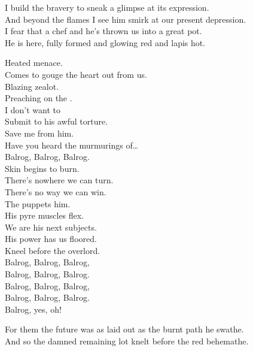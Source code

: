 
I build the bravery to sneak a glimpse at its expression. \\
And beyond the flames I see him smirk at our present depression. \\

I fear that  a chef and he's thrown us into a great pot. \\
He is here, fully formed and glowing red and lapis hot. \\


Heated menace. \\
Comes to gouge the heart out from us. \\
Blazing zealot. \\
Preaching on the . \\
I don't want to \\
Submit to his awful torture. \\
Save me from him. \\
Have you heard the murmurings of… \\

Balrog, Balrog, Balrog. \\

Skin begins to burn. \\
There's nowhere we can turn. \\
There's no way we can win. \\
The  puppets him. \\

His pyre muscles flex. \\
We are his next subjects. \\
His power has us floored. \\
Kneel before the overlord. \\

Balrog, Balrog, Balrog, \\
Balrog, Balrog, Balrog. \\

Balrog, Balrog, Balrog, \\
Balrog, Balrog, Balrog. \\
Balrog, yes, oh! \\


For them the future was as laid out as the burnt path he swathe. \\
And so the damned remaining lot knelt before the red behemathe. \\

